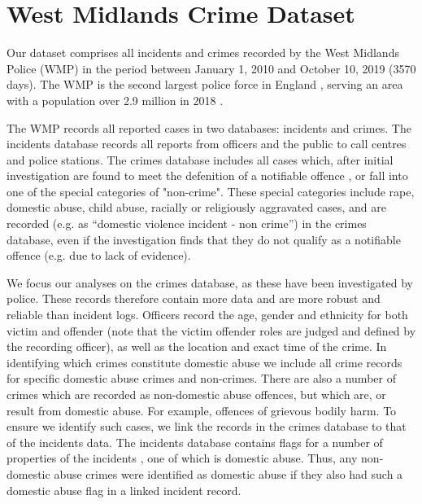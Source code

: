 \documentclass[12pt, a4paper]{article}
\begin{document}
\section{West Midlands Crime Dataset}


Our dataset comprises all incidents and crimes recorded by the West Midlands Police (WMP) in the period between January 1, 2010 and October 10, 2019 (3570 days). The WMP is the second largest police force in England \cite{Homeoffice}, serving an area with a population over 2.9 million in 2018 \cite{populationfigure}. 

The WMP records all reported cases in two databases: incidents and crimes. The incidents database records all reports from officers and the public to call centres and police stations. The crimes database includes all cases which, after initial investigation are found to meet the defenition of a notifiable offence , or fall into one of the special categories of "non-crime". These special categories include rape, domestic abuse, child abuse, racially or religiously aggravated cases, and are recorded (e.g. as ``domestic violence incident - non crime'') in the crimes database, even if the investigation finds that they do not qualify as a notifiable offence (e.g. due to lack of evidence).
 
We focus our analyses on the crimes database, as these have been investigated by police. These records therefore contain more data and are more robust and reliable than incident logs. Officers record the age, gender and ethnicity for both victim and offender (note that the victim offender roles are judged and defined by the recording officer), as well as the location and exact time of the crime. 
In identifying which crimes constitute domestic abuse we include all crime records for specific domestic abuse crimes and non-crimes. There are also a number of crimes which are recorded as non-domestic abuse offences, but which are, or result from domestic abuse. For example, offences of grievous bodily harm. To ensure we identify such cases, we link the records in the crimes database to that of the incidents data. The incidents database contains flags for a number of properties of the incidents , one of which is domestic abuse. Thus, any non-domestic abuse crimes were identified as domestic abuse if they also had such a domestic abuse flag in a linked incident record.
\end{document}

